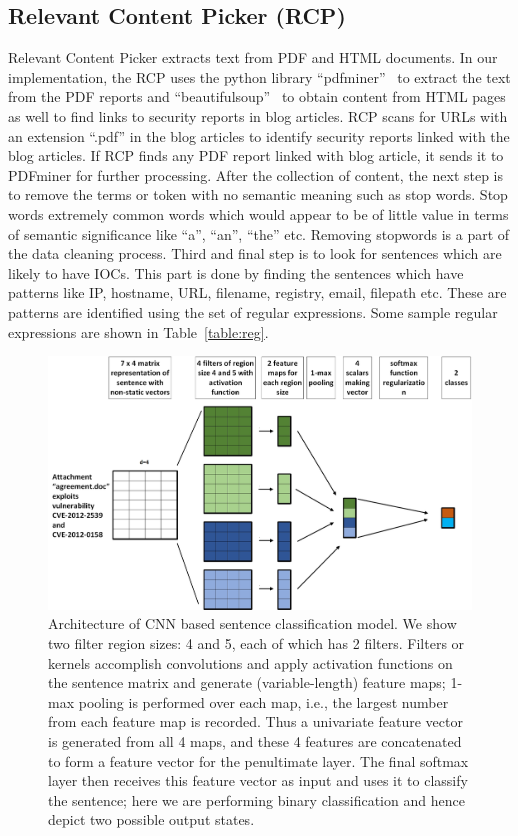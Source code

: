 \subsection{Relevant Content Picker (RCP)}
Relevant Content Picker extracts text from PDF and HTML documents. In our implementation, the RCP uses the python library ``pdfminer''~\cite{pdfminer} to extract the text from the PDF reports and ``beautifulsoup''~\cite{beautifulsoup} to obtain content from HTML pages as well to find links to security reports in blog articles. RCP scans for URLs with an extension ``.pdf'' in the blog articles to identify security reports linked with the blog articles. If RCP finds any PDF report linked with blog article, it sends it to PDFminer for further processing. After the collection of content, the next step is to remove the terms or token with no semantic meaning such as stop words. Stop words extremely common words which would appear to be of little value in terms of semantic significance like ``a'', ``an'', ``the'' etc. Removing stopwords is a part of the data cleaning process. Third and final step is to look for sentences which are likely to have IOCs. This part is done by finding the sentences which have patterns like IP, hostname, URL, filename, registry, email, filepath etc. These are patterns are identified using the set of regular expressions. Some sample regular expressions are shown in Table~\ref{table:reg}. 




\begin{figure}[tb]
\centering
\includegraphics [width=\linewidth]{CNN_sentence.jpg}
\caption[]{Architecture of CNN based sentence classification model. We show two filter region sizes: 4 and 5, each of which has 2 filters. Filters or kernels accomplish convolutions and apply activation functions on the sentence matrix and generate (variable-length) feature maps; 1-max pooling is performed over each map, i.e., the largest number from each feature map is recorded. Thus a univariate feature vector is generated from all 4 maps, and these 4 features are concatenated to form a feature vector for the penultimate layer. The final softmax layer then receives this feature vector as input and uses it to classify the sentence; here we are performing binary classification and hence depict two possible output states.}
\label{fig:CNNsentence}
\end{figure}


